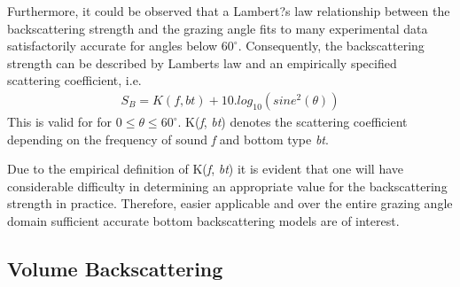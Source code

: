 \noindent Furthermore, it could be observed that a Lambert?s law relationship between the backscattering strength and the grazing angle fits to many experimental data satisfactorily accurate for angles below $60^{\circ}$. Consequently, the backscattering strength can be described by Lambert\textsc{}s law and an empirically specified scattering coefficient, i.e.
\begin{align}
 {S_B}  = K ( \textit{f}, \textit{bt}) + 10 . log_{10}( sine^{2}(\theta)) 
 \end{align}
 \noindent This is valid for for $0 \leq \theta \leq 60^{\circ}$. K(\textit{f}, \textit{bt}) denotes the scattering coefficient depending on the frequency of sound \textit{f} and bottom type \textit{bt}.
 
\noindent Due to the empirical definition of K(\textit{f}, \textit{bt}) it is evident that one will have considerable difficulty in determining an appropriate value for the backscattering strength in practice. Therefore, easier applicable and over the entire grazing angle domain sufficient accurate bottom backscattering models are of interest.
 
 
 

\subsection{ Volume Backscattering } \label{ Volume Backscattering } 


